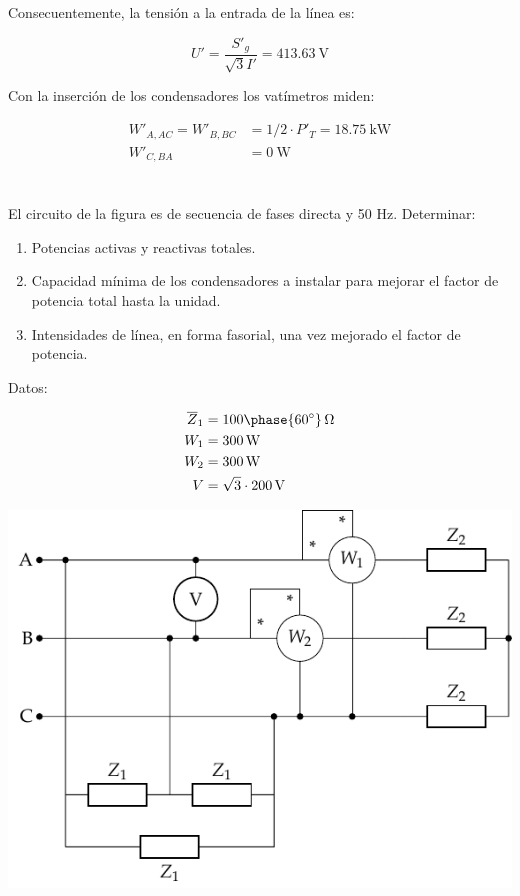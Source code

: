 \documentclass[12pt]{article}
\begin{document}
Consecuentemente, la tensión a la entrada de la línea es:

\[
U' = \frac{S'_g}{\sqrt{3} I'} = \SI{413.63}{\volt}
\]

Con la inserción de los condensadores los vatímetros miden:

\begin{align*}
W'_{A, AC} = W'_{B, BC} &= 1/2 \cdot P'_T = \SI{18.75}{\kilo\watt}\\
W'_{C, BA} &= \SI{0}{\watt}
\end{align*}

\clearpage

\section{}

El circuito de la figura es de secuencia de fases directa y 50 Hz. Determinar:
\begin{enumerate}
\item Potencias activas y reactivas totales.
\item Capacidad mínima de los condensadores a instalar para mejorar el factor de potencia total hasta la unidad.
\item Intensidades de línea, en forma fasorial, una vez mejorado el factor de potencia.
\end{enumerate}
Datos: 

\begin{align*}
  \overline{Z}_1 &= \SI[parse-numbers=false]{100\phase{\ang{60}}}{\ohm}\\
  W_1 &= \SI{300}{\watt}\\
  W_2 &= \SI{300}{\watt}\\
  V &= \SI[parse-numbers=false]{\sqrt{3} \cdot 200}{\volt}
\end{align*}

\begin{center}
  \includegraphics{../figs/ZyZt}
\end{center}
\end{document}

